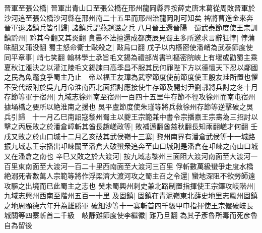 晉軍至張公橋|{
	晉軍出青山口至張公橋在邢州龍岡縣界按薛史唐末葛從周敗晉軍於沙河追至張公橋沙河縣在邢州南二十五里而邢州治龍岡則可知矣}
裨將曹進金來奔晉軍退諸鎮兵皆引歸|{
	諸鎮兵謂燕趙潞之兵}
八月晉王還晉陽　蜀武泰節度使王宗訓鎮黔州|{
	黔其今翻又其炎翻}
貪㬥不法擅還成都庚辰見蜀主多所邀求言辭狂悖|{
	悖蒲昧翻又蒲没翻}
蜀主怒命衛士敺殺之|{
	敺烏口翻}
戊子以内樞密使潘峭為武泰節度使同平章事|{
	峭七笑翻}
翰林學士承旨毛文錫為禮部尚書判樞密院峽上有堰或勸蜀主乘夏秋江漲決之以灌江陵毛文錫諫曰高季昌不服其民何罪陛下方以德懷天下忍以鄰國之民為魚鼈食乎蜀主乃止　帝以福王友璋為武寧節度使前節度使王殷友珪所置也懼不受代叛附於吳九月命淮南西北面招討應接使牛存節及開封尹劉鄩將兵討之冬十月存節等軍于宿州|{
	九域志徐州南至宿州一百四十五里牛存節不徑攻徐州而南屯宿州據埇橋之要所以絶淮南之援也}
吳平盧節度使朱瑾等將兵救徐州存節等逆擊破之吳兵引歸　十一月乙巳南詔寇黎州蜀主以夔王宗範兼中書令宗播嘉王宗壽為三招討以擊之丙辰敗之於潘倉嶂斬其酋長趙嵯政等|{
	敗補邁翻酋慈秋翻長知兩翻嵯才何翻}
壬戌又敗之於山口城十二月乙亥破其武侯嶺十三寨|{
	黎州南界有潘倉武侯等十一城路振九域志王宗播出卭崍關至潘倉大破蠻衆追奔至山口城則是潘倉在卭崍之南山口城又在潘倉之南也}
辛巳又敗之於大渡河|{
	按九域志黎州三面阻大渡河南面至大渡河一百里東南面至大渡河一百二十里西南面至大渡河三百里}
俘斬數萬級蠻爭走度水橋絶溺死者數萬人宗範等將作浮梁濟大渡河攻之蜀主召之令還|{
	蠻地深阻不欲勞師遠攻驅之出境而已此蜀主之志也}
癸未蜀興州刺史兼北路制置指揮使王宗鐸攻岐階州|{
	九域志興州西南至階州五百一十里}
及固鎮|{
	固鎮在青泥嶺東北薛史地里志鳳州固鎮之地周顯德六年升為雄勝軍}
破細沙等十一寨斬首四千級甲申指揮使王宗儼破岐長城關等四寨斬首二千級　岐靜難節度使李繼徽|{
	難乃旦翻}
為其子彥魯所毒而死彦魯自為留後

